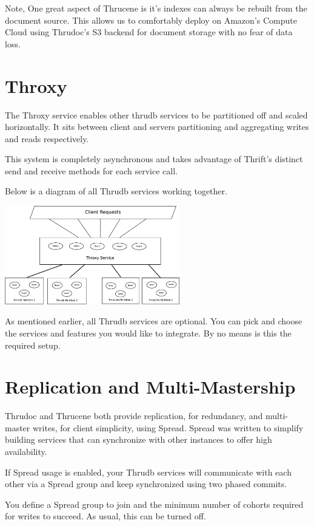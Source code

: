 \documentclass[nocopyrightspace,blockstyle]{sigplanconf}
\begin{document}
Note, One great aspect of Thrucene is it's indexes can always be rebuilt from the document source. 
This allows us to comfortably deploy on Amazon's Compute Cloud using Thrudoc's S3 backend for 
document storage with no fear of data loss.   

\section{Throxy}

The Throxy service enables other thrudb services to be partitioned off and scaled horizontally.  
It sits between client and servers partitioning and aggregating writes and reads respectively.

This system is completely asynchronous and takes advantage of  
Thrift's distinct send and receive methods for each service call. 

Below is a diagram of all Thrudb services working together.

\includegraphics[width=3.00in]{Throxy.eps}

As mentioned earlier, all Thrudb services are optional. You can pick and choose the services and features you would like to integrate. 
By no means is this the required setup.

\section{Replication and Multi-Mastership}

Thrudoc and Thrucene both provide replication, for redundancy, and multi-master writes, for client simplicity, using 
Spread.  Spread was written to simplify building services that can synchronize with other instances to offer high availability.  

If Spread usage is enabled, your Thrudb services will communicate with each other via a Spread group and keep synchronized using two phased commits.

You define a Spread group to join and the minimum number of cohorts required for writes to succeed.  As usual, this can be turned off. 
\end{document}
